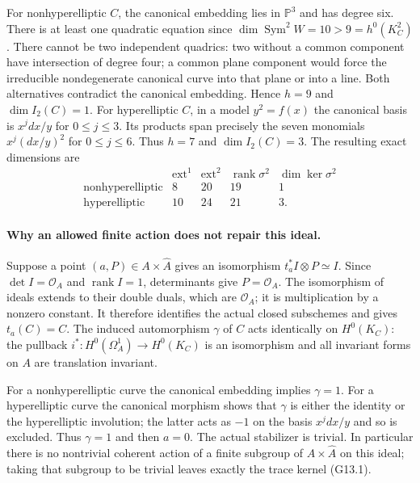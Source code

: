 For nonhyperelliptic $C$, the canonical embedding lies in
$\mathbb P^3$ and has degree six. There is at least one quadratic
equation since $\dim\operatorname{Sym}^2W=10>9=h^0(K_C^2)$.
There cannot be two independent quadrics: two without a common
component have intersection of degree four; a common plane
component would force the irreducible nondegenerate canonical
curve into that plane or into a line. Both alternatives contradict
the canonical embedding. Hence $h=9$ and $\dim I_2(C)=1$.
For hyperelliptic $C$, in a model $y^2=f(x)$ the canonical basis
is $x^jdx/y$ for $0\le j\le3$. Its products span precisely the
seven monomials $x^j(dx/y)^2$ for $0\le j\le6$.
Thus $h=7$ and $\dim I_2(C)=3$. The resulting exact dimensions are
\[
\begin{array}{c|rrrr}
 &\operatorname{ext}^1&\operatorname{ext}^2&
       \operatorname{rank}\sigma^2&\dim\ker\sigma^2\\\hline
 \text{nonhyperelliptic}&8&20&19&1\\
 \text{hyperelliptic}&10&24&21&3.
\end{array}
\]

\paragraph{Why an allowed finite action does not repair this ideal.}
Suppose a point $(a,P)\in A\times\widehat A$ gives an
isomorphism $t_a^*I\otimes P\simeq I$. Since $\det I=\mathcal O_A$
and $\operatorname{rank}I=1$, determinants give $P=\mathcal O_A$.
The isomorphism of ideals extends to their double duals, which
are $\mathcal O_A$; it is multiplication by a nonzero constant.
It therefore identifies the actual closed subschemes and gives
$t_a(C)=C$. The induced automorphism $\gamma$ of $C$ acts
identically on $H^0(K_C)$: the pullback
$i^*:H^0(\Omega_A^1)\to H^0(K_C)$ is an isomorphism and all
invariant forms on $A$ are translation invariant.

For a nonhyperelliptic curve the canonical embedding implies
$\gamma=1$. For a hyperelliptic curve the canonical morphism
shows that $\gamma$ is either the identity or the hyperelliptic
involution; the latter acts as $-1$ on the basis $x^jdx/y$ and
so is excluded. Thus $\gamma=1$ and then $a=0$.
The actual stabilizer is trivial. In particular there is no
nontrivial coherent action of a finite subgroup of
$A\times\widehat A$ on this ideal; taking that subgroup to be
trivial leaves exactly the trace kernel (G13.1).

